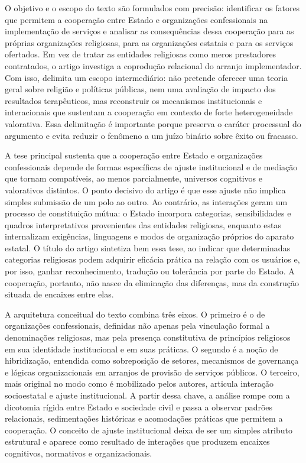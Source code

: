 \documentclass[12pt,a4paper]{article}
\begin{document}
O objetivo e o escopo do texto são formulados com precisão: identificar os fatores que permitem a cooperação entre Estado e organizações confessionais na implementação de serviços e analisar as consequências dessa cooperação para as próprias organizações religiosas, para as organizações estatais e para os serviços ofertados. Em vez de tratar as entidades religiosas como meros prestadores contratados, o artigo investiga a coprodução relacional do arranjo implementador. Com isso, delimita um escopo intermediário: não pretende oferecer uma teoria geral sobre religião e políticas públicas, nem uma avaliação de impacto dos resultados terapêuticos, mas reconstruir os mecanismos institucionais e interacionais que sustentam a cooperação em contexto de forte heterogeneidade valorativa. Essa delimitação é importante porque preserva o caráter processual do argumento e evita reduzir o fenômeno a um juízo binário sobre êxito ou fracasso.\parencite{lotta2023_jesus_speaks}

A tese principal sustenta que a cooperação entre Estado e organizações confessionais depende de formas específicas de ajuste institucional e de mediação que tornam compatíveis, ao menos parcialmente, universos cognitivos e valorativos distintos. O ponto decisivo do artigo é que esse ajuste não implica simples submissão de um polo ao outro. Ao contrário, as interações geram um processo de constituição mútua: o Estado incorpora categorias, sensibilidades e quadros interpretativos provenientes das entidades religiosas, enquanto estas internalizam exigências, linguagens e modos de organização próprios do aparato estatal. O título do artigo sintetiza bem essa tese, ao indicar que determinadas categorias religiosas podem adquirir eficácia prática na relação com os usuários e, por isso, ganhar reconhecimento, tradução ou tolerância por parte do Estado. A cooperação, portanto, não nasce da eliminação das diferenças, mas da construção situada de encaixes entre elas.\parencite{lotta2023_jesus_speaks}

A arquitetura conceitual do texto combina três eixos. O primeiro é o de organizações confessionais, definidas não apenas pela vinculação formal a denominações religiosas, mas pela presença constitutiva de princípios religiosos em sua identidade institucional e em suas práticas. O segundo é a noção de hibridização, entendida como sobreposição de setores, mecanismos de governança e lógicas organizacionais em arranjos de provisão de serviços públicos. O terceiro, mais original no modo como é mobilizado pelos autores, articula interação socioestatal e ajuste institucional. A partir dessa chave, a análise rompe com a dicotomia rígida entre Estado e sociedade civil e passa a observar padrões relacionais, sedimentações históricas e acomodações práticas que permitem a cooperação. O conceito de ajuste institucional deixa de ser um simples atributo estrutural e aparece como resultado de interações que produzem encaixes cognitivos, normativos e organizacionais.\parencite{lotta2023_jesus_speaks}
\end{document}

